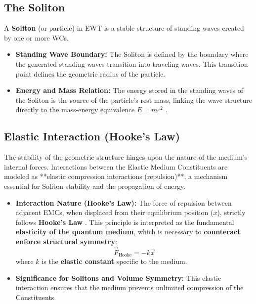 \documentclass[10pt,a4paper]{article}
\begin{document}
\subsection{The Soliton}

A \textbf{Soliton} (or particle) in EWT is a stable structure of standing waves created by one or more WCs.

\begin{itemize}
	\item \textbf{Standing Wave Boundary:} The Soliton is defined by the boundary where the generated standing waves transition into traveling waves. This transition point defines the geometric radius of the particle.
	\item \textbf{Energy and Mass Relation:} The energy stored in the standing waves of the Soliton is the source of the particle's rest mass, linking the wave structure directly to the mass-energy equivalence $E=mc^2$ \cite{yee2019geometry}.
\end{itemize}


\subsection{Elastic Interaction (Hooke's Law)}\label{sec:hookes_law}

The stability of the geometric structure hinges upon the nature of the medium's internal forces. Interactions between the Elastic Medium Constituents are modeled as **elastic compression interactions (repulsion)**, a mechanism essential for Soliton stability and the propagation of energy.

\begin{itemize}
	\item \textbf{Interaction Nature (Hooke's Law):} The force of repulsion between adjacent EMCs, when displaced from their equilibrium position ($x$), strictly follows \textbf{Hooke's Law} \cite{yee2019spacetime, Yee2020Physics}. This principle is interpreted as the fundamental \textbf{elasticity of the quantum medium}, which is necessary to \textbf{counteract} \textbf{enforce structural symmetry}:
	\begin{equation}
		\vec{F}_{\text{Hooke}} = -k \vec{x}
		\label{eq:hooke_law}
	\end{equation}
	where $k$ is the \textbf{elastic constant} specific to the medium.
	\item \textbf{Significance for Solitons and Volume Symmetry:} This elastic interaction ensures that the medium prevents unlimited compression of the Constituents.
\end{itemize}
\end{document}
